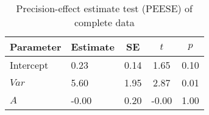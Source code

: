 \begin{table}[ht]
\centering
\caption{Precision-effect estimate test (PEESE) of complete data} 
\label{tab:PEESE}
\begingroup\small
\begin{tabular}{llccc}
  \hline
Parameter & Estimate & SE & $t$ & $p$ \\ 
  \hline
Intercept & 0.23 & 0.14 & 1.65 & 0.10 \\ 
  $Var$ & 5.60 & 1.95 & 2.87 & 0.01 \\ 
  $A$ & -0.00 & 0.20 & -0.00 & 1.00 \\ 
   \hline
\end{tabular}
\endgroup
\end{table}
